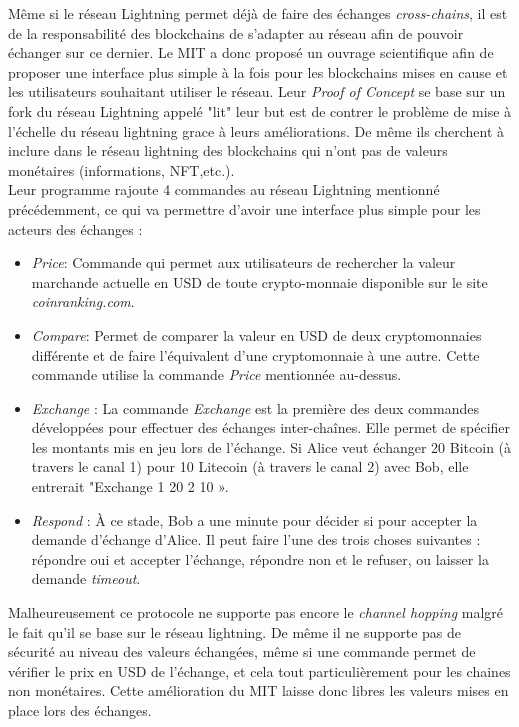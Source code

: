 Même si le réseau Lightning permet déjà de faire des échanges \textit{\gls{cross-chain}s}\cite{lightningCrossChain}, il est de la responsabilité des \gls{blockchain}s de s'adapter au réseau afin de pouvoir échanger sur ce dernier.
Le MIT a donc proposé un ouvrage scientifique\cite{mathus2018lightning} afin de proposer une interface plus simple à la fois pour les \gls{blockchain}s mises en cause et les utilisateurs souhaitant utiliser le réseau.
Leur \textit{Proof of Concept}\cite{pocMIT} se base sur un fork du réseau Lightning appelé "lit" leur but est de contrer le problème de mise à l'échelle du réseau lightning grace à leurs améliorations.
De même ils cherchent à inclure dans le réseau lightning des \gls{blockchain}s qui n'ont pas de valeurs monétaires (informations, NFT,etc.).
\\
Leur programme rajoute 4 commandes au réseau Lightning mentionné précédemment, ce qui va permettre d'avoir une interface plus simple pour les acteurs des échanges :
\begin{itemize}
    \item \textit{Price}: Commande qui permet aux utilisateurs de rechercher la valeur marchande actuelle en USD de toute crypto-monnaie disponible sur le site \textit{coinranking.com}.\\
    \item \textit{Compare}: Permet de comparer la valeur en USD de deux cryptomonnaies différente et de faire l'équivalent d'une cryptomonnaie à une autre. Cette commande utilise la commande \textit{Price} mentionnée au-dessus.\\
    \item \textit{Exchange} : La commande \textit{Exchange} est la première des deux commandes développées pour effectuer des échanges inter-chaînes. Elle permet de spécifier les montants mis en jeu lors de l'échange. Si Alice veut échanger 20 \gls{Bitcoin} (à travers le canal 1) pour 10 Litecoin (à travers le canal 2) avec Bob, elle entrerait "Exchange 1 20 2 10 ».\\
    \item \textit{Respond} : À ce stade, Bob a une minute pour décider si pour accepter la demande d'échange d'Alice. Il peut faire l'une des trois choses suivantes : répondre oui et accepter l'échange, répondre non et le refuser, ou laisser la demande \textit{timeout}.\\
\end{itemize}


Malheureusement ce protocole ne supporte pas encore le \textit{channel hopping} malgré le fait qu'il se base sur le réseau lightning. 
De même il ne supporte pas de sécurité au niveau des valeurs échangées, même si une commande permet de vérifier le prix en USD de l'échange, et cela tout particulièrement pour les chaines non monétaires.
Cette amélioration du MIT laisse donc libres les valeurs mises en place lors des échanges. 
